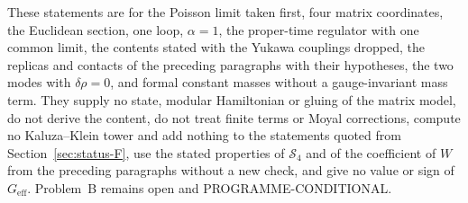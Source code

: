 These statements are for the Poisson limit taken first, four matrix coordinates, the Euclidean section, one loop, \(\alpha=1\), the proper-time regulator with one common limit, the contents stated with the Yukawa couplings dropped, the replicas and contacts of the preceding paragraphs with their hypotheses, the two modes with \(\delta\rho=0\), and formal constant masses without a gauge-invariant mass term. They supply no state, modular Hamiltonian or gluing of the matrix model, do not derive the content, do not treat finite terms or Moyal corrections, compute no Kaluza--Klein tower and add nothing to the statements quoted from Section~\ref{sec:status-F}, use the stated properties of \(\mathcal S_4\) and of the coefficient of \(W\) from the preceding paragraphs without a new check, and give no value or sign of \(G_{\mathrm{eff}}\). Problem~B remains open and PROGRAMME-CONDITIONAL.

